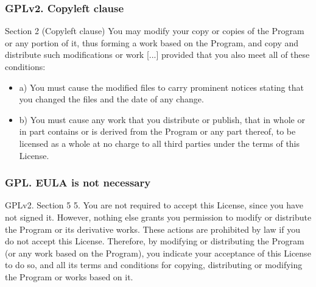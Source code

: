 \documentclass{beamer}
\begin{document}
\begin{frame}
\frametitle{GPLv2. Copyleft clause}

\begin{block}{Section 2 (Copyleft clause)} 
You may modify your copy or copies of the Program or any portion of it, thus forming a work based on the Program, and copy and distribute such modifications or work [...] provided that you also meet all of these conditions:

\medskip

\begin{itemize}
\item a) You must cause the modified files to carry \alert{prominent notices} stating that you changed the files and the date of any change.
\item b) You must cause any work that you distribute or publish, that in whole or in part contains or is derived from the Program or any part thereof, to be licensed as a whole at no charge to all third parties \alert{under the terms of this License}.
\end{itemize}
 
\end{block}

\end{frame}


\begin{frame}
\frametitle{GPL. EULA is not necessary}

\begin{block}{GPLv2. Section 5} 
5. \alert{You are not required to accept this License, since you have not signed it. However, nothing else grants you permission to modify or distribute the Program or its derivative works.} These actions are prohibited by law if you do not accept this License. Therefore, by modifying or distributing the Program (or any work based on the Program), you indicate your acceptance of this License to do so, and all its terms and conditions for copying, distributing or modifying the Program or works based on it.
 
\end{block}

\end{frame}
\end{document}
